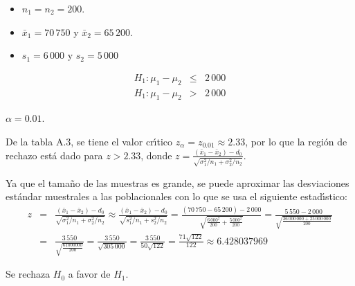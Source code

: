 \begin{solucion}
 \begin{datos}
  $\phantom{0}$
  \begin{itemize}
   \item $n_1 = n_2 = 200$.
   \item $\bar{x}_1 = 70\,750$ y $\bar{x}_2 = 65\,200$.
   \item $s_1 = 6\,000$ y $s_2 = 5\,000$
  \end{itemize}
 \end{datos}

 \begin{hipotesis}
  \begin{eqnarray*}
   H_1: \mu_1 - \mu_2 & \leq & 2\,000 \\
   H_1: \mu_1 - \mu_2 & > & 2\,000
  \end{eqnarray*}
 \end{hipotesis}

 \begin{significancia}
  $\alpha = 0.01$.
 \end{significancia}

 \begin{region}
  De la tabla A.3, se tiene el valor cr\'{\i}tico $z_{\alpha} = z_{0.01} \approx 2.33$, por lo que la regi\'on de rechazo est\'a dado para $z > 2.33$, donde $z = \frac{\left( \bar{x}_1 - \bar{x}_2 \right) - d_0}{\sqrt{\sigma_1^2/n_1 + \sigma_2^2/n_2}}$.
 \end{region}

 \begin{estadistico}
  Ya que el tama\~no de las muestras es grande, se puede aproximar las desviaciones est\'andar muestrales a las poblacionales con lo que se usa el siguiente estad\'{\i}stico:
  \begin{eqnarray*}
   z & = & \frac{\left( \bar{x}_1 - \bar{x}_2 \right) - d_0}{\sqrt{\sigma_1^2/n_1 + \sigma_2^2/n_2}} \approx \frac{\left( \bar{x}_1 - \bar{x}_2 \right) - d_0}{\sqrt{s_1^2/n_1 + s_2^2/n_2}} = \frac{(70\,750 - 65\,200) - 2\,000}{\sqrt{\frac{6\,000^2}{200} + \frac{5\,000^2}{200}}} = \frac{5\,550 - 2\,000}{\sqrt{\frac{36\,000\,000 + 25\,000\,000}{200}}} \\
   & = & \frac{3\,550}{\sqrt{\frac{61000000}{200}}} = \frac{3\,550}{\sqrt{305\,000}} = \frac{3\,550}{50\sqrt{122}} = \frac{71\sqrt{122}}{122} \approx 6.428037969
  \end{eqnarray*}
 \end{estadistico}

 \begin{decision}
  Se rechaza $H_0$ a favor de $H_1$.
 \end{decision}


\end{solucion}
